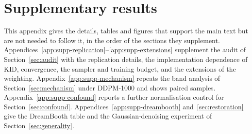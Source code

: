 \FloatBarrier
\section{Supplementary results}\label{app:supp}
This appendix gives the details, tables and figures that support the main
text but are not needed to follow it, in the order of the sections they
supplement. Appendices~\ref{app:supp-replication}--\ref{app:supp-extensions}
supplement the audit of Section~\ref{sec:audit} with the replication details,
the implementation dependence of KID, convergence, the sampler and training
budget, and the extensions of the weighting.
Appendix~\ref{app:supp-mechanism} repeats the band analysis of
Section~\ref{sec:mechanism} under DDPM-1000 and shows paired samples.
Appendix~\ref{app:supp-confound} reports a further normalisation control for
Section~\ref{sec:confound}. Appendices~\ref{app:supp-dreambooth}
and~\ref{sec:restoration} give the DreamBooth table and the
Gaussian-denoising experiment of Section~\ref{sec:generality}.

\FloatBarrier
{}
\FloatBarrier
{}
\FloatBarrier
